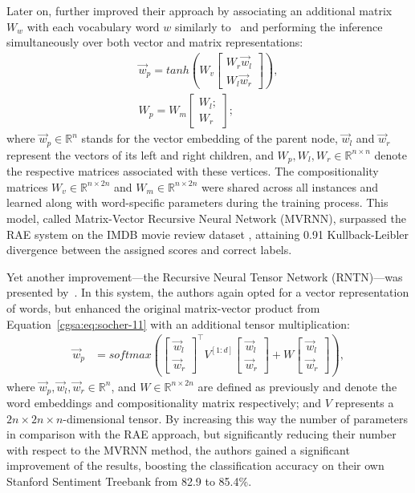 Later on, \citet{Socher:12} further improved their approach by
associating an additional matrix $W_w$ with each vocabulary word $w$
similarly to~\citet{Yessenalina:10} and performing the inference
simultaneously over both vector and matrix representations:
\begin{align*}
  \vec{w}_p = tanh\left(W_v \begin{bmatrix}W_r\vec{w}_l\\
      W_l \vec{w}_r\end{bmatrix} \right),\\
  W_p = W_m \begin{bmatrix}W_l;\\
    W_r\end{bmatrix};
\end{align*}
where $\vec{w}_p\in\mathbb{R}^n$ stands for the vector embedding of
the parent node, $\vec{w}_l$ and $\vec{w}_r$ represent the vectors of
its left and right children, and $W_p, W_l, W_r \in
\mathbb{R}^{n\times n}$ denote the respective matrices associated with
these vertices.  The compositionality matrices
$W_v\in\mathbb{R}^{n\times 2n}$ and $W_m\in\mathbb{R}^{n\times 2n}$
were shared across all instances and learned along with word-specific
parameters during the training process.  This model, called
Matrix-Vector Recursive Neural Network (MVRNN), surpassed the RAE
system on the IMDB movie review dataset \cite{Pang:05}, attaining 0.91
Kullback-Leibler divergence between the assigned scores and correct
labels.

Yet another improvement---the Recursive Neural Tensor Network
(RNTN)---was presented by~\citet{Socher:13}.  In this system, the
authors again opted for a vector representation of words, but enhanced
the original matrix-vector product from
Equation~\ref{cgsa:eq:socher-11} with an additional tensor
multiplication:
\begin{align*}
  \vec{w}_p &= softmax\left(\begin{bmatrix}
  \vec{w}_l\\
  \vec{w}_r
  \end{bmatrix}^{\top}V^{[1:d]}\begin{bmatrix}
  \vec{w}_l\\
  \vec{w}_r
  \end{bmatrix}
            + W\begin{bmatrix}
  \vec{w}_l\\
  \vec{w}_r
\end{bmatrix}\right),\label{cgsa:eq:socher-13}
\end{align*}
where $\vec{w}_p, \vec{w}_l, \vec{w}_r\in\mathbb{R}^n$, and
$W\in\mathbb{R}^{n\times 2n}$ are defined as previously and denote the
word embeddings and compositionality matrix respectively; and $V$
represents a $2n\times 2n\times n$-dimensional tensor.  By increasing
this way the number of parameters in comparison with the RAE approach,
but significantly reducing their number with respect to the MVRNN
method, the authors gained a significant improvement of the results,
boosting the classification accuracy on their own Stanford Sentiment
Treebank from 82.9 to 85.4\%.

